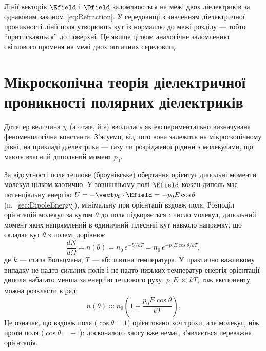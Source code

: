 \begin{Attention}
	Лінії векторів $\Efield$ і $\Dfield$ заломлюються на межі двох діелектриків за однаковим законом~\eqref{eq:Refraction}. У середовищі з
	 значенням діелектричної проникності лінії поля утворюють  кут із нормаллю до межі розділу --- тобто \enquote{притискаються}
	до поверхні. Це явище цілком аналогічне заломленню світлового променя на межі двох оптичних середовищ.
\end{Attention}

\section{Мікроскопічна теорія діелектричної проникності полярних діелектриків}\label{sec:Langevin-Debye}

Дотепер величина $\chi$ (а отже, й $\epsilon$) вводилась як експериментально визначувана феноменологічна константа. З'ясуємо, від чого вона
залежить на мікроскопічному рівні, на прикладі  діелектрика --- газу чи розрідженої рідини з молекулами, що мають власний
дипольний момент $p_0$.

За відсутності поля теплове (броунівське) обертання орієнтує дипольні моменти молекул цілком хаотично. У зовнішньому полі $\Efield$ кожен диполь
має потенціальну енергію $U = -\vect p_0\cdot\Efield = -p_0 E\cos\theta$ (п.~\ref{sec:DipoleEnergy}), мінімальну при орієнтації вздовж поля.
Розподіл орієнтацій молекул за кутом $\theta$ до поля підкоряється : число молекул, дипольний момент яких напрямлений в
одиничний тілесний кут навколо напрямку, що складає кут $\theta$ з полем, дорівнює
\begin{equation*}
	\frac{dN}{d\Omega} = n(\theta) = n_0\, e^{-U/kT} = n_0\, e^{+p_0 E\cos\theta / kT},
\end{equation*}
де $k$ --- стала Больцмана, $T$ --- абсолютна температура. У практично важливому випадку не надто сильних полів і не надто низьких температур
енергія орієнтації диполя набагато менша за енергію теплового руху, $p_0 E \ll kT$, тож експоненту можна розкласти в ряд:
\begin{equation}\label{eq:Boltzmann}
	n(\theta) \approx n_0\left(1 + \frac{p_0 E \cos\theta}{kT}\right).
\end{equation}
Це означає, що вздовж поля ($\cos\theta = 1$) орієнтовано хоч трохи, але  молекул, ніж проти поля ($\cos\theta = -1$): досконалого
хаосу вже немає, з'являється переважна орієнтація.

